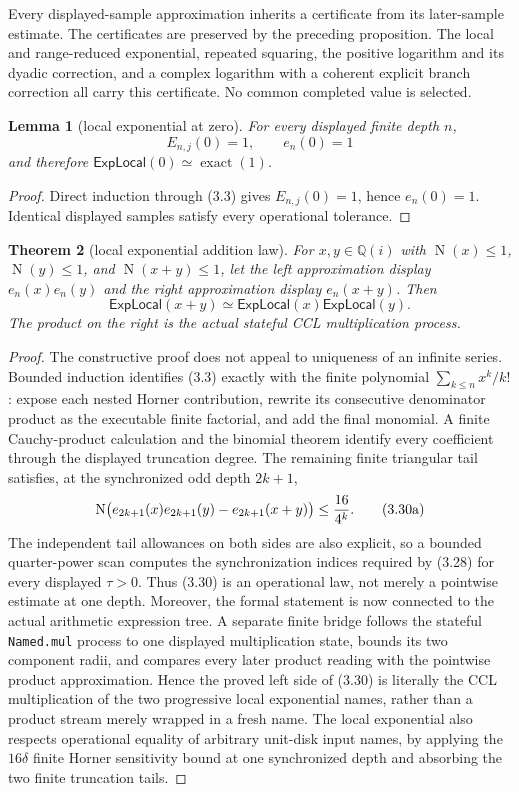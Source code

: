\documentclass[10pt]{article}
\newtheorem{theorem}{Theorem}[section]
\newtheorem{lemma}[theorem]{Lemma}
\theoremstyle{definition}
\theoremstyle{remark}
\newcommand{\Qi}{\mathbb{Q}(i)}
\newcommand{\Norm}{\operatorname{N}}
\begin{document}
Every displayed-sample approximation inherits a
certificate from its later-sample estimate.  The certificates are preserved
by the preceding proposition.  The local and range-reduced exponential,
repeated squaring, the positive logarithm and its dyadic correction, and a
complex logarithm with a coherent explicit branch correction all carry this
certificate.  No common completed value is selected.

\begin{lemma}[local exponential at zero]
For every displayed finite depth $n$,
\[
 E_{n,j}(0)=1,\qquad e_n(0)=1
\tag{3.29}
\]
and therefore $\mathsf{ExpLocal}(0)\simeq\operatorname{exact}(1)$.
\end{lemma}

\begin{proof}
Direct induction through (3.3) gives $E_{n,j}(0)=1$, hence $e_n(0)=1$.
Identical displayed samples satisfy every operational tolerance.
\end{proof}

\begin{theorem}[local exponential addition law]
For
$x,y\in\Qi$ with $\Norm(x)\le1$, $\Norm(y)\le1$, and
$\Norm(x+y)\le1$, let the left approximation display
$e_n(x)e_n(y)$ and the right approximation display $e_n(x+y)$.  Then
\[
 \mathsf{ExpLocal}(x+y)\simeq
 \mathsf{ExpLocal}(x)\mathsf{ExpLocal}(y).
\tag{3.30}
\]
The product on the right is the actual stateful CCL multiplication process.
\end{theorem}

\begin{proof}
The constructive proof does not appeal to uniqueness of an infinite
series.  Bounded induction identifies (3.3) exactly with the finite
polynomial $\sum_{k\le n}x^k/k!$: expose each nested Horner contribution,
rewrite its consecutive denominator product as the executable finite
factorial, and add the final monomial.  A finite Cauchy-product calculation
and the binomial theorem identify every coefficient through the displayed
truncation degree.  The remaining finite triangular tail satisfies, at the
synchronized odd depth $2k+1$,
\[
 \Norm\bigl(e_{2k+1}(x)e_{2k+1}(y)-e_{2k+1}(x+y)\bigr)
 \le {16\over4^k}.
 \tag{3.30a}
\]
The independent tail allowances on both sides are also explicit, so a
bounded quarter-power scan computes the synchronization indices required by
(3.28) for every displayed $\tau>0$.  Thus (3.30) is an operational law,
not merely a pointwise estimate at one depth.
Moreover, the formal statement is now connected to the actual arithmetic
expression tree.  A separate finite bridge follows the stateful
\texttt{Named.mul} process to one displayed multiplication state, bounds its
two component radii, and compares every later product reading with the
pointwise product approximation.  Hence the proved left side of (3.30) is
literally the CCL multiplication of the two progressive local exponential
names, rather than a product stream merely wrapped in a fresh name.  The
local exponential also respects operational equality of arbitrary
unit-disk input names, by applying the $16\delta$ finite Horner sensitivity
bound at one synchronized depth and absorbing the two finite truncation
tails.
\end{proof}
\end{document}
